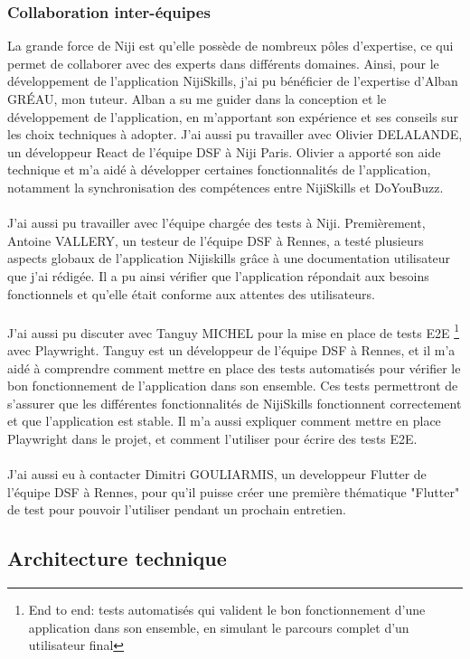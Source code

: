 \documentclass[12pt]{article}
\begin{document}
\subsubsection{Collaboration inter-équipes}
La grande force de Niji est qu'elle possède de nombreux pôles d'expertise, ce qui permet de collaborer avec des experts dans différents domaines. Ainsi, pour le développement de l'application NijiSkills, j'ai pu bénéficier de l'expertise d'Alban GRÉAU, mon tuteur. Alban a su me guider dans la conception et le développement de l'application, en m'apportant son expérience et ses conseils sur les choix techniques à adopter. J'ai aussi pu travailler avec Olivier DELALANDE, un développeur React de l'équipe DSF à Niji Paris. Olivier a apporté son aide technique et m'a aidé à développer certaines fonctionnalités de l'application, notamment la synchronisation des compétences entre NijiSkills et DoYouBuzz.
\\\\
J'ai aussi pu travailler avec l'équipe chargée des tests à Niji. Premièrement, Antoine VALLERY, un testeur de l'équipe DSF à Rennes, a testé plusieurs aspects globaux de l'application Nijiskills grâce à une documentation utilisateur que j'ai rédigée. Il a pu ainsi vérifier que l'application répondait aux besoins fonctionnels et qu'elle était conforme aux attentes des utilisateurs. 
\\\\
J'ai aussi pu discuter avec Tanguy MICHEL pour la mise en place de tests E2E \footnote{End to end:  tests automatisés qui valident le bon fonctionnement d’une application dans son ensemble, en simulant le parcours complet d’un utilisateur final } avec Playwright. Tanguy est un développeur de l'équipe DSF à Rennes, et il m'a aidé à comprendre comment mettre en place des tests automatisés pour vérifier le bon fonctionnement de l'application dans son ensemble. Ces tests permettront de s'assurer que les différentes fonctionnalités de NijiSkills fonctionnent correctement et que l'application est stable. Il m'a aussi expliquer comment mettre en place Playwright dans le projet, et comment l'utiliser pour écrire des tests E2E.
\\\\
J'ai aussi eu à contacter Dimitri GOULIARMIS, un developpeur Flutter de l'équipe DSF à Rennes, pour qu'il puisse créer une première thématique "Flutter" de test pour pouvoir l'utiliser pendant un prochain entretien.

\subsection{Architecture technique}
\end{document}
